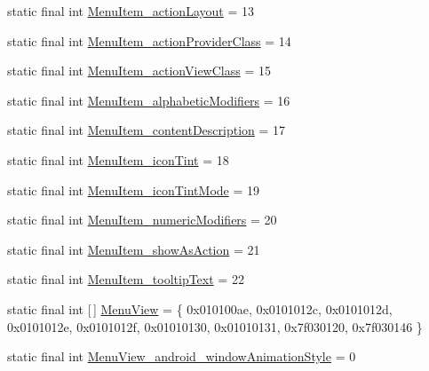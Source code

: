 \begin{DoxyCompactItemize}
static final int \mbox{\hyperlink{classandroid_1_1support_1_1design_1_1R_1_1styleable_acea82da8f9d7bec29eb669375e904049}{Menu\+Item\+\_\+action\+Layout}} = 13
\item 
static final int \mbox{\hyperlink{classandroid_1_1support_1_1design_1_1R_1_1styleable_a5ccb9af96cb8f5856eabfcc584bbe29e}{Menu\+Item\+\_\+action\+Provider\+Class}} = 14
\item 
static final int \mbox{\hyperlink{classandroid_1_1support_1_1design_1_1R_1_1styleable_ae854f3663bd672c1729dd9f452823498}{Menu\+Item\+\_\+action\+View\+Class}} = 15
\item 
static final int \mbox{\hyperlink{classandroid_1_1support_1_1design_1_1R_1_1styleable_ada7f8610f6078b9dee5984fb38a66ad2}{Menu\+Item\+\_\+alphabetic\+Modifiers}} = 16
\item 
static final int \mbox{\hyperlink{classandroid_1_1support_1_1design_1_1R_1_1styleable_a290ef30f805846fc2b9728fdd6498c50}{Menu\+Item\+\_\+content\+Description}} = 17
\item 
static final int \mbox{\hyperlink{classandroid_1_1support_1_1design_1_1R_1_1styleable_a4ff69a8941296f4691e40a4227e39004}{Menu\+Item\+\_\+icon\+Tint}} = 18
\item 
static final int \mbox{\hyperlink{classandroid_1_1support_1_1design_1_1R_1_1styleable_a2d72b2124b229a3477bfc2097bced1e2}{Menu\+Item\+\_\+icon\+Tint\+Mode}} = 19
\item 
static final int \mbox{\hyperlink{classandroid_1_1support_1_1design_1_1R_1_1styleable_adc5e7f177e1243ae380bdb71d967162e}{Menu\+Item\+\_\+numeric\+Modifiers}} = 20
\item 
static final int \mbox{\hyperlink{classandroid_1_1support_1_1design_1_1R_1_1styleable_a9228bf5ad0fd30f0f56bd75d963d21c7}{Menu\+Item\+\_\+show\+As\+Action}} = 21
\item 
static final int \mbox{\hyperlink{classandroid_1_1support_1_1design_1_1R_1_1styleable_ac0c3633e22b8cec6f62c2a53df003f2f}{Menu\+Item\+\_\+tooltip\+Text}} = 22
\item 
static final int \mbox{[}$\,$\mbox{]} \mbox{\hyperlink{classandroid_1_1support_1_1design_1_1R_1_1styleable_acaf80b4eb554eab1b6f3b7f929ac7039}{Menu\+View}} = \{ 0x010100ae, 0x0101012c, 0x0101012d, 0x0101012e, 0x0101012f, 0x01010130, 0x01010131, 0x7f030120, 0x7f030146 \}
\item 
static final int \mbox{\hyperlink{classandroid_1_1support_1_1design_1_1R_1_1styleable_a34456b5445aaf302afb7e7acb7887c20}{Menu\+View\+\_\+android\+\_\+window\+Animation\+Style}} = 0
\item 

\end{DoxyCompactItemize}
